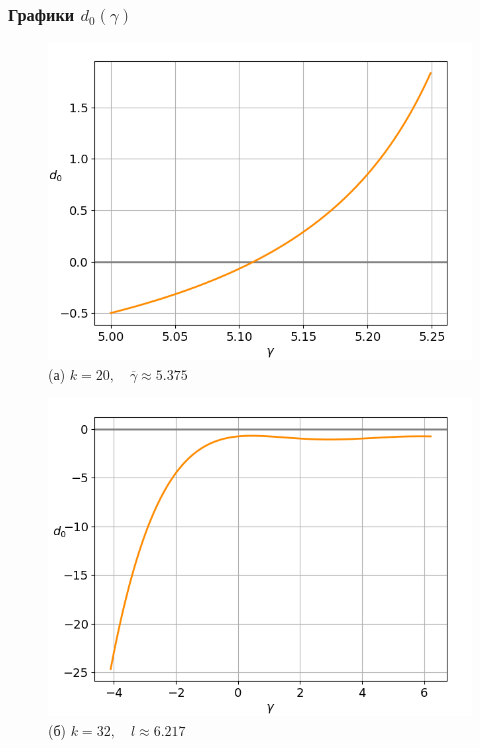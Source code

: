 \documentclass[fullscreen=true, unicode, bookmarks=false]{beamer}
\begin{document}
\begin{frame}
\frametitle{ Графики $ d_0(\gamma) $ }

\begin{figure} 
\begin{minipage}[h]{0.49\linewidth}
\begin{center}
\includegraphics[scale=0.39]{divergent_d0_039.png} \\ (а) $ k=20, \quad \overline{\gamma}\approx 5.375 $
\end{center}
\end{minipage} 
\hfill
\begin{minipage}[h]{0.49\linewidth}
\begin{center}
\includegraphics[scale=0.39]{divergent_d0_063.png}  \\ (б) $ k=32, \quad l \approx 6.217 $
\end{center}
\end{minipage} 
\end{figure}

\end{frame}
\end{document}
